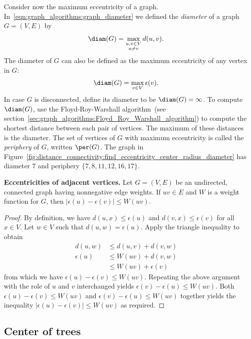 Consider now the maximum eccentricity of a
graph. In~\eqref{eqn:graph_algorithms:graph_diameter} we defined the
\emph{diameter} of a graph $G = (V,E)$ by
\[
\diam(G)\index{$\diam(G)$}
=
\max_{\substack{u,v \in V \\ u \neq v}} d(u,v).
\]
The diameter of $G$ can also be defined as the maximum eccentricity of
any vertex in $G$:
\[
\diam(G)
=
\max_{v \in V} \epsilon(v).
\]
In case $G$ is disconnected, define its diameter to be
$\diam(G) = \infty$. To compute $\diam(G)$, use the Floyd-Roy-Warshall
algorithm~(see
section~\ref{sec:graph_algorithms:Floyd_Roy_Warshall_algorithm}) to
compute the shortest distance between each pair of vertices. The
maximum of these distances is the diameter. The set of vertices of $G$
with maximum eccentricity is called the \emph{periphery} of $G$,
written $\per(G)$. The graph in
Figure~\ref{fig:distance_connectivity:find_eccentricity_center_radius_diameter}
has diameter $7$ and periphery $\{7, 8, 11, 12, 16, 17\}$.

\begin{theorem}
\textbf{Eccentricities of adjacent vertices.}
Let $G = (V,E)$ be an undirected, connected graph having nonnegative
edge weights. If $uv \in E$ and $W$ is a weight function for $G$, then
$|\epsilon(u) - \epsilon(v)| \leq W(uv)$.
\end{theorem}

\begin{proof}
By definition, we have $d(u,x) \leq \epsilon(u)$ and
$d(v,x) \leq \epsilon(v)$ for all $x \in V$. Let $w \in V$ such that
$d(u,w) = \epsilon(u)$. Apply the triangle inequality to obtain
\begin{align*}
d(u,w) &\leq d(u,v) + d(v,w) \\
\epsilon(u) &\leq W(uv) + d(v,w) \\
            &\leq W(uv) + \epsilon(v)
\end{align*}
from which we have $\epsilon(u) - \epsilon(v) \leq W(uv)$. Repeating
the above argument with the role of $u$ and $v$ interchanged yields
$\epsilon(v) - \epsilon(u) \leq W(uv)$. Both
$\epsilon(u) - \epsilon(v) \leq W(uv)$ and
$\epsilon(v) - \epsilon(u) \leq W(uv)$ together yields the inequality
$|\epsilon(u) - \epsilon(v)| \leq W(uv)$ as required.
\end{proof}



\subsection{Center of trees}

